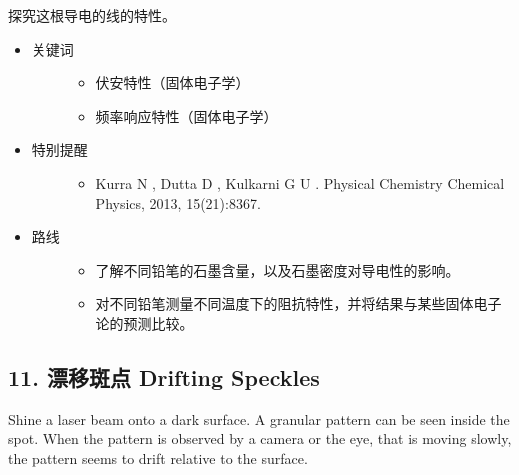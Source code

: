 \documentclass[a4paper,10pt,english]{sphinxmanual}
\begin{document}
探究这根导电的线的特性。
\begin{itemize}
\item {} \begin{description}
\item[{关键词}] \leavevmode\begin{itemize}
\item {} 
伏安特性（固体电子学）

\item {} 
频率响应特性（固体电子学）

\end{itemize}

\end{description}

\item {} \begin{description}
\item[{特别提醒}] \leavevmode\begin{itemize}
\item {} 
Kurra N , Dutta D , Kulkarni G U .  Physical Chemistry Chemical Physics, 2013, 15(21):8367.

\end{itemize}

\end{description}

\item {} \begin{description}
\item[{路线}] \leavevmode\begin{itemize}
\item {} 
了解不同铅笔的石墨含量，以及石墨密度对导电性的影响。

\item {} 
对不同铅笔测量不同温度下的阻抗特性，并将结果与某些固体电子论的预测比较。

\end{itemize}

\end{description}

\end{itemize}


\subsection{11. 漂移斑点 Drifting Speckles}
\label{\detokenize{7. Appendix:drifting-speckles}}
Shine a laser beam onto a dark surface. A granular pattern can be seen inside the spot. When the pattern is observed by a camera or the eye, that is moving slowly, the pattern seems to drift relative to the surface.
\end{document}
